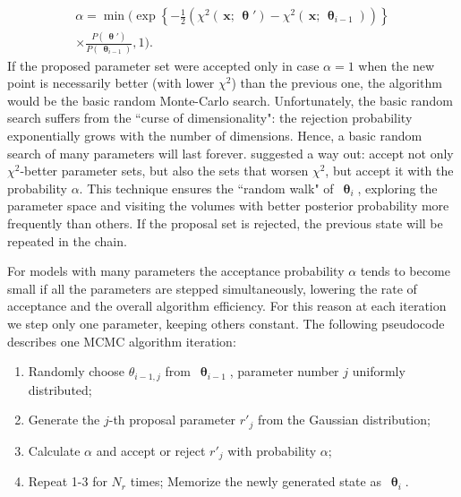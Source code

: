 \documentclass[preprint2]{aastex}
\newcommand{\bfx}{\,\mathbf{x}}
\newcommand{\bfth}{\,\bm{\uptheta}}
\begin{document}
\begin{eqnarray}
  \label{accept_probab3}
  \alpha = \min \biggl( \exp \left\lbrace -\frac{1}{2}\left( \chi^2(\bfx;\bfth') -
                         \chi^2(\bfx;\bfth_{i-1}) \right)  \right\rbrace                   \nonumber \\
          \times \frac{P(\bfth')} {P(\bfth_{i-1})}, 1 \biggr) .    
\end{eqnarray}
If the proposed parameter set were accepted only in case $\alpha=1$ when the new point is necessarily better (with lower $\chi^2$) than the previous one, the algorithm would be the basic random Monte-Carlo search. Unfortunately, the basic random search suffers from the ``curse of dimensionality": the rejection probability exponentially grows with the number of dimensions. Hence, a basic random search of many parameters will last forever. \citet{Metropolis_etal_1953} suggested a way out: accept not only $\chi^2$-better parameter sets, but also the sets that worsen $\chi^2$, but accept it with the probability $\alpha$. This technique ensures the ``random walk" of $\bfth_i$, exploring the parameter space and visiting the volumes with better posterior probability more frequently than others. If the proposal set is rejected, the previous state will be repeated in the chain.

For models with many parameters the acceptance probability $\alpha$ tends to become small if all the parameters are stepped simultaneously, lowering the rate of acceptance and the overall algorithm efficiency. For this reason at each iteration we step only one parameter, keeping others constant. The following pseudocode describes one MCMC algorithm iteration:
\begin{enumerate}
\item Randomly choose $\theta_{i-1,j}$ from $\bfth_{i-1}$, parameter number $j$ uniformly distributed;
\item Generate the $j$-th proposal parameter $r'_j$ from the Gaussian distribution;
\item Calculate $\alpha$ and accept or reject $r'_j$ with probability $\alpha$;
\item Repeat 1-3 for $N_r$ times; Memorize the newly generated state as $\bfth_i$.
\end{enumerate}
\end{document}
